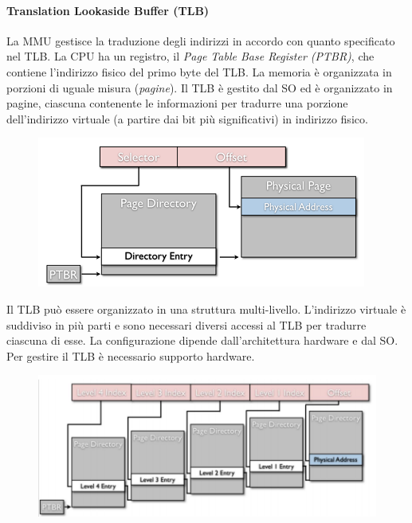 \documentclass{article}
\begin{document}
\paragraph{Translation Lookaside Buffer (TLB)}
La MMU gestisce la traduzione degli indirizzi in accordo con quanto specificato nel TLB.
La CPU ha un registro, il \textit{Page Table Base Register (PTBR)}, che contiene l’indirizzo fisico del primo byte del TLB. La memoria è organizzata in porzioni di uguale misura (\textit{pagine}).
Il TLB è gestito dal SO ed è organizzato in pagine, ciascuna contenente le informazioni per tradurre una porzione dell’indirizzo virtuale (a partire dai bit più significativi) in indirizzo fisico.
\begin{figure}[H]
    \centering
    \includegraphics[scale=0.8]{img/Virt_tech/5.png}
    \caption{}
\end{figure}\noindent
Il TLB può essere organizzato in una struttura multi-livello. L’indirizzo virtuale è suddiviso in più parti e sono necessari diversi accessi al TLB per tradurre ciascuna di esse.
La configurazione dipende dall’architettura hardware e dal SO. Per gestire il TLB è necessario supporto hardware.
\begin{figure}[H]
    \centering
    \includegraphics[scale=0.8]{img/Virt_tech/6.png}
    \caption{}
\end{figure}\noindent
\end{document}
